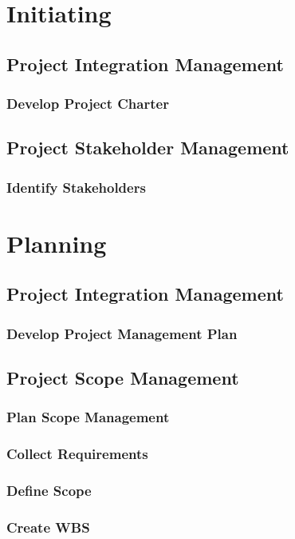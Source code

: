 \documentclass[12pt,letterpaper]{report}
\date{Revision Date: \today}
\author{Program Manager: Program Manager}
\title
{
	\Huge{\textbf{Project Management Plan}} \\
	\textbf{\projectname} \\ 
	\subtitle
}
\begin{document}
	\maketitle
	\tableofcontents
	
	\part{Initiating}
	\chapter{Project Integration Management}
	\section{Develop Project Charter}
	\chapter{Project Stakeholder Management}
	\section{Identify Stakeholders}
	
	
	\part{Planning}
	\chapter{Project Integration Management}
	\section{Develop Project Management Plan}
	\chapter{Project Scope Management}
	\section{Plan Scope Management}
	\section{Collect Requirements}
	\section{Define Scope}
	\section{Create WBS}
\end{document}

